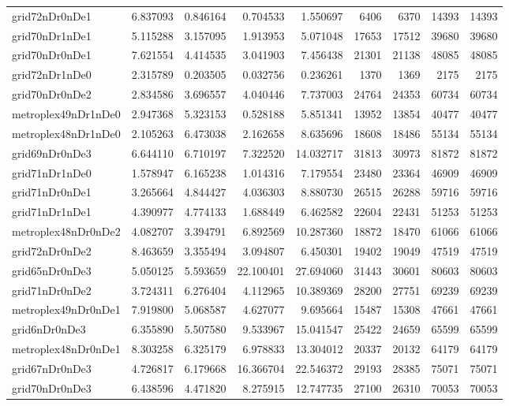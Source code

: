 \begin{longtable}{|l|r|r|r|r|r|r|r|r|}
grid72nDr0nDe1 & 6.837093 & 0.846164 & 0.704533 & 1.550697 & 6406 & 6370 & 14393 & 14393 \\
grid70nDr1nDe1 & 5.115288 & 3.157095 & 1.913953 & 5.071048 & 17653 & 17512 & 39680 & 39680 \\
grid70nDr0nDe1 & 7.621554 & 4.414535 & 3.041903 & 7.456438 & 21301 & 21138 & 48085 & 48085 \\
grid72nDr1nDe0 & 2.315789 & 0.203505 & 0.032756 & 0.236261 & 1370 & 1369 & 2175 & 2175 \\
grid70nDr0nDe2 & 2.834586 & 3.696557 & 4.040446 & 7.737003 & 24764 & 24353 & 60734 & 60734 \\
metroplex49nDr1nDe0 & 2.947368 & 5.323153 & 0.528188 & 5.851341 & 13952 & 13854 & 40477 & 40477 \\
metroplex48nDr1nDe0 & 2.105263 & 6.473038 & 2.162658 & 8.635696 & 18608 & 18486 & 55134 & 55134 \\
grid69nDr0nDe3 & 6.644110 & 6.710197 & 7.322520 & 14.032717 & 31813 & 30973 & 81872 & 81872 \\
grid71nDr1nDe0 & 1.578947 & 6.165238 & 1.014316 & 7.179554 & 23480 & 23364 & 46909 & 46909 \\
grid71nDr0nDe1 & 3.265664 & 4.844427 & 4.036303 & 8.880730 & 26515 & 26288 & 59716 & 59716 \\
grid71nDr1nDe1 & 4.390977 & 4.774133 & 1.688449 & 6.462582 & 22604 & 22431 & 51253 & 51253 \\
metroplex48nDr0nDe2 & 4.082707 & 3.394791 & 6.892569 & 10.287360 & 18872 & 18470 & 61066 & 61066 \\
grid72nDr0nDe2 & 8.463659 & 3.355494 & 3.094807 & 6.450301 & 19402 & 19049 & 47519 & 47519 \\
grid65nDr0nDe3 & 5.050125 & 5.593659 & 22.100401 & 27.694060 & 31443 & 30601 & 80603 & 80603 \\
grid71nDr0nDe2 & 3.724311 & 6.276404 & 4.112965 & 10.389369 & 28200 & 27751 & 69239 & 69239 \\
metroplex49nDr0nDe1 & 7.919800 & 5.068587 & 4.627077 & 9.695664 & 15487 & 15308 & 47661 & 47661 \\
grid6nDr0nDe3 & 6.355890 & 5.507580 & 9.533967 & 15.041547 & 25422 & 24659 & 65599 & 65599 \\
metroplex48nDr0nDe1 & 8.303258 & 6.325179 & 6.978833 & 13.304012 & 20337 & 20132 & 64179 & 64179 \\
grid67nDr0nDe3 & 4.726817 & 6.179668 & 16.366704 & 22.546372 & 29193 & 28385 & 75071 & 75071 \\
grid70nDr0nDe3 & 6.438596 & 4.471820 & 8.275915 & 12.747735 & 27100 & 26310 & 70053 & 70053 \\

\end{longtable}
